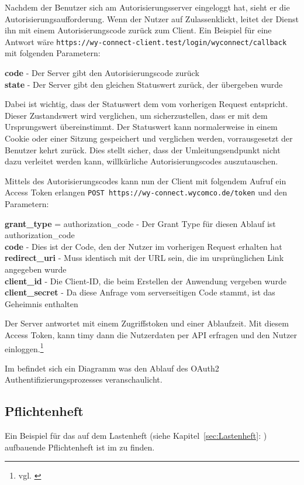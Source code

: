 Nachdem der Benutzer sich am Autorisierungsserver eingeloggt hat, sieht er die Autorisierungsaufforderung. Wenn der Nutzer auf \flqq Zulassen\frqq  klickt, leitet der Dienst ihn mit einem Autorisierungscode zurück zum Client. Ein Beispiel für eine Antwort wäre \texttt{https://wy-connect-client.test/login/wyconnect/callback} mit folgenden Parametern:

\textbf{code} - Der Server gibt den Autorisierungscode zurück \\
\textbf{state} - Der Server gibt den gleichen Statuswert zurück, der übergeben wurde

Dabei ist wichtig, dass der Statuswert dem vom vorherigen Request entspricht. Dieser Zustandswert wird verglichen, um sicherzustellen, dass er mit dem Ursprungswert übereinstimmt. Der Statuswert kann normalerweise in einem Cookie oder einer Sitzung gespeichert und verglichen werden, vorrausgesetzt der Benutzer kehrt zurück. Dies stellt sicher, dass der Umleitungsendpunkt nicht dazu verleitet werden kann, willkürliche Autorisierungscodes auszutauschen.

Mittels des Autorisierungscodes kann nun der Client mit folgendem Aufruf ein Access Token erlangen \texttt{POST https://wy-connect.wycomco.de/token} und den Parametern:
  
\textbf{grant\_type} = authorization\_code - Der Grant Type für diesen Ablauf ist authorization\_code \\
\textbf{code} - Dies ist der Code, den der Nutzer im vorherigen Request erhalten hat \\
\textbf{redirect\_uri} - Muss identisch mit der URL sein, die im ursprünglichen Link angegeben wurde \\
\textbf{client\_id} - Die Client-ID, die beim Erstellen der Anwendung vergeben wurde \\
\textbf{client\_secret} - Da diese Anfrage vom serverseitigen Code stammt, ist das Geheimnis enthalten

Der Server antwortet mit einem Zugriffstoken und einer Ablaufzeit. Mit diesem Access Token, kann timy dann die Nutzerdaten per API erfragen und den Nutzer einloggen.\footnote{vgl. \cite{heise}}

Im  befindet sich ein Diagramm was den Ablauf des OAuth2 Authentifizierungsprozesses veranschaulicht. 

\subsection{Pflichtenheft}
\label{sec:Pflichtenheft}

Ein Beispiel für das auf dem Lastenheft (siehe Kapitel~\ref{sec:Lastenheft}: ) aufbauende Pflichtenheft ist im  zu finden.

